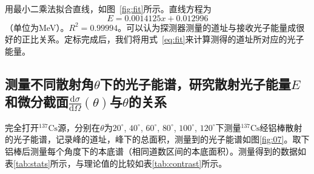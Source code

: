 \documentclass[aps,pre,12pt,preprint,onecolumn,showpacs,showkeys]{revtex4-1}
\def \d {\mathrm d}
\def \cs {\frac{\d \sigma}{\d \Omega}(\theta)}
\def \Cs {^{137}\mathrm{Cs}}
\def \degree {^\circ}
\begin{document}
用最小二乘法拟合直线，如图~\ref{fig:fit}所示。直线方程为
\begin{equation}
E=0.0014125 x + 0.012996 \label{eq:fit}
\end{equation}
（单位为MeV）。$R^2=0.99994$。可以认为探测器测量的道址与接收光子能量成很好的正比关系。定标完成后，我们将用式~\ref{eq:fit}来计算测得的道址所对应的光子能量。
\subsection{测量不同散射角$\theta$下的光子能谱，研究散射光子能量$E$和微分截面$\cs$与$\theta$的关系}
完全打开$\Cs$源，分别在$\theta$为$20\degree$, $40\degree$, $60\degree$, $80\degree$, $100\degree$, $120\degree$下测量$\Cs$经铝棒散射的光子能谱，记录峰的道址，峰下的总面积，测量到的光子能谱如图\ref{fig:07}。取下铝棒后测量每个角度下的本底谱（相同道数区间的本底面积）。测量得到的数据如表\ref{tab:stats}所示，与理论值的比较如表\ref{tab:contrast}所示。
\end{document}
